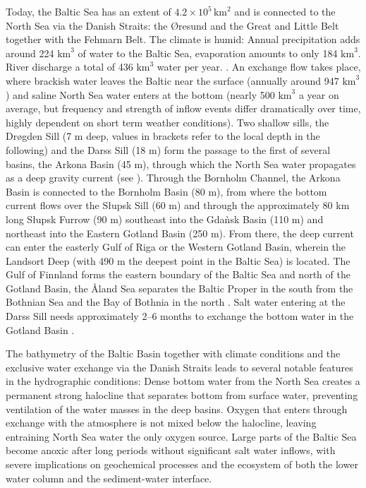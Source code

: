 Today, the Baltic Sea has an extent of $4.2 \times 10^{5} \, \text{km}^2$ 
\citep[][]{balticsea} and is connected to the North Sea via the Danish Straits: 
the \O resund and the Great and Little Belt together with the Fehmarn Belt. The 
climate is humid: Annual precipitation adds around 224 $\text{km}^3$ of water to 
the Baltic Sea, evaporation amounts to only 184 $\text{km}^3$. River discharge a 
total of 436 $\text{km}^3$ water per year. \citep[][]{reissmann2009}. An 
exchange flow takes place, where brackish water leaves the Baltic near the 
surface (annually around 947 $\text{km}^3$) and saline North Sea water enters at 
the bottom (nearly 500 $\text{km}^3$ a year on average, but frequency and 
strength of inflow events differ dramatically over time, highly dependent on 
short term weather conditions). Two shallow sills, the Dr\o gden Sill (7 m deep, 
values in brackets refer to the local depth in the following) and the Darss Sill 
(18 m) form the passage to the first of several basins, the Arkona Basin (45 m), 
through which the North Sea water propagates as a deep gravity current 
(see ). Through 
the Bornholm Channel, the Arkona Basin is connected to the Bornholm Basin (80 
m), from where the bottom current flows over the S\l upsk Sill (60 m) and 
through the approximately 80 km long S\l upsk Furrow (90 m) southeast into the 
Gda\`{n}sk Basin (110 m) and northeast into the Eastern Gotland Basin (250 m). 
From there, the deep current can enter the easterly Gulf of Riga or the Western 
Gotland Basin, wherein the Landsort Deep (with 490 m the deepest point in the 
Baltic Sea) is located. The Gulf of Finnland forms the eastern boundary of the 
Baltic Sea and north of the Gotland Basin, the \r{A}land Sea separates the 
Baltic Proper in the south from the Bothnian Sea and the Bay of Bothnia in the 
north \citep[][]{reissmann2009}. Salt water entering at the Darss Sill needs 
approximately 2--6 months to exchange the bottom water in the Gotland Basin 
\citep[][]{balticsea}.

The bathymetry of the Baltic Basin together with climate conditions and the exclusive water exchange via the Danish Straits leads to several notable features in the hydrographic conditions: Dense bottom water from the North Sea creates a permanent strong halocline that separates bottom from surface water, preventing ventilation of the water masses in the deep basins. Oxygen that enters through exchange with the atmosphere is not mixed below the halocline, leaving entraining North Sea water the only oxygen source. Large parts of the Baltic Sea become anoxic after long periods without significant salt water inflows, with severe implications on geochemical processes and the ecosystem of both the lower water column and the sediment-water interface. 

